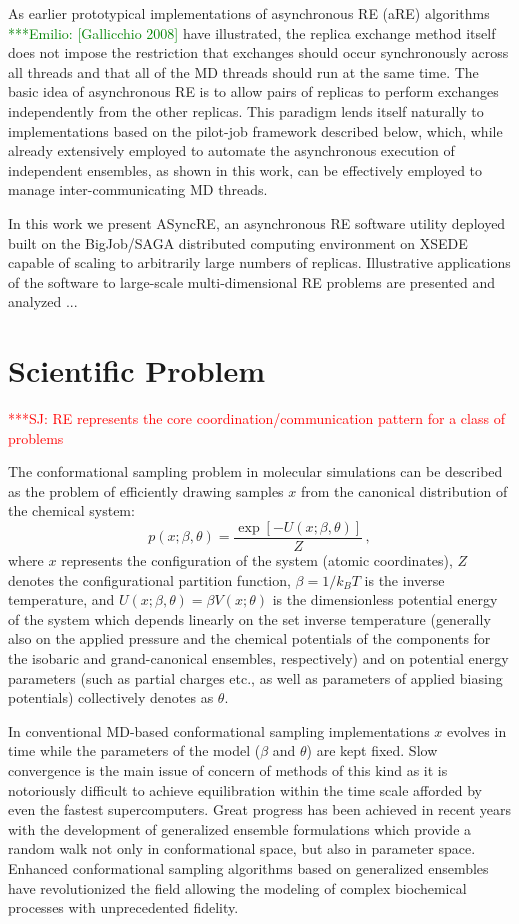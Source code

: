 \documentclass{sig-alternate}
\newcommand{\jhanote}[1]{ {\textcolor{red} { ***SJ: #1 }}}
\newcommand{\egnote}[1]{ {\textcolor{green} { ***Emilio: #1 }}}
\newcommand{\jhanote}[1]{}
\begin{document}
As earlier prototypical implementations of asynchronous RE (aRE)
algorithms \egnote{[Gallicchio 2008]} have illustrated, the replica
exchange method itself does not impose the restriction that exchanges
should occur synchronously across all threads and that all of the MD
threads should run at the same time. The basic idea of asynchronous
RE is to allow pairs of replicas to perform exchanges independently
from the other replicas. This paradigm lends itself naturally to
implementations based on the pilot-job framework described below,
which, while already extensively employed to automate the asynchronous
execution of independent ensembles, as shown in this work, can be
effectively employed to manage inter-communicating MD threads.

In this work we present ASyncRE, an asynchronous RE software utility
deployed built on the BigJob/SAGA distributed computing environment on
XSEDE capable of scaling to arbitrarily large numbers of
replicas. Illustrative applications of the software to large-scale
multi-dimensional RE problems are presented and analyzed ...

\section{Scientific Problem}\label{sec:requirements}

\jhanote{RE represents the core coordination/communication pattern for
  a class of problems} 

The conformational sampling problem in molecular simulations can be
described as the problem of efficiently drawing samples $x$ from the
canonical distribution of the chemical system:
\begin{equation}
p(x;\beta,\theta) = \frac{\exp[-U(x;\beta,\theta)]}{Z} \, ,
\end{equation}
where $x$ represents the configuration of the system (atomic
coordinates), $Z$ denotes the configurational partition function,
$\beta=1/k_B T$ is the inverse temperature, and
$U(x;\beta,\theta)=\beta V(x;\theta)$ is the dimensionless potential
energy of the system which depends linearly on the set inverse temperature
(generally also on the applied pressure and the chemical potentials of
the components for the isobaric and grand-canonical ensembles,
respectively) and on potential energy parameters (such as partial
charges etc., as well as parameters of applied biasing potentials)
collectively denotes as $\theta$.

In conventional MD-based conformational sampling implementations $x$
evolves in time while the parameters of the model ($\beta$ and
$\theta$) are kept fixed. Slow convergence is the main issue of
concern of methods of this kind as it is notoriously difficult to
achieve equilibration within the time scale afforded by even the
fastest supercomputers. Great progress has been achieved in recent
years with the development of generalized ensemble formulations which
provide a random walk not only in conformational space,
but also in parameter space.  Enhanced conformational sampling
algorithms based on generalized ensembles have revolutionized the
field allowing the modeling of complex biochemical processes with
unprecedented fidelity.
\end{document}
